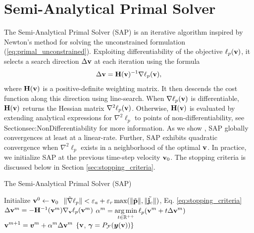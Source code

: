 

\section{Semi-Analytical Primal Solver}
\label{sec:sap_solver}

The Semi-Analytical Primal Solver (SAP) is an iterative algorithm inspired
by Newton's method for solving the unconstrained  formulation (\ref{eq:primal_unconstrained}). Exploiting differentiability of the objective
$\ell_p({\mathbf{v}})$, it selects a search direction $\Delta{\mathbf{v}}$ at each iteration using the
formula
\[
  \Delta{\mathbf{v}} =  {\mathbf{H}}({\mathbf{v}})^{-1} \nabla \ell_p({\mathbf{v}}),
\]
where ${\mathbf{H}}({\mathbf{v}})$ is a positive-definite weighting
matrix. It then descends the cost function along this direction
using line-search.  When $\nabla \ell_p({\mathbf{v}})$ is differentiable,
${\mathbf{H}}({\mathbf{v}})$ returns the Hessian matrix $\nabla^2 \ell_p({\mathbf{v}})$.
Otherwise, ${\mathbf{H}}({\mathbf{v}})$ is evaluated by extending
analytical expressions for $\nabla^2 \ell_p$ to points
of non-differentiability, see Section{sec:NonDifferentiability} for more information.  As we show , SAP 
globally convergences at least at a linear-rate.
Further, SAP exhibits quadratic convergence when
$\nabla^2 \ell_p$ exists in a neighborhood of the
optimal ${\mathbf{v}}$.
In practice, we initialize SAP at the previous time-step velocity ${\mathbf{v}}_0$.
The stopping criteria is discussed below in Section
\ref{sec:stopping_criteria}.

\begin{algorithm}[H]
  \caption{The Semi-Analytical Primal Solver (SAP)}	
	\label{alg:sap}
	\begin{algorithmic}[1]
		\State Initialize ${\mathbf{v}}^0 \gets {\mathbf{v}}_0$
		\RepeatUntil $~\Vert\tilde{\nabla}\ell_p\Vert < \varepsilon_a + \varepsilon_r\max(\Vert\tilde{{\mathbf{p}}}\Vert,\Vert\tilde{{\mathbf{j}}_c}\Vert)$, Eq. \eqref{eq:stopping_criteria}
			\State $\Delta{\mathbf{v}}^{m} = -{\mathbf{H}}^{-1}({\mathbf{v}}^m)\nabla_{\mathbf{v}}\ell_p({\mathbf{v}}^m)$ \label{op:Newton_iteration}
			\State $\displaystyle \alpha^m = \operatorname*{arg\,min}_{t\in\mathbb{R}^{++}} \ell_p({\mathbf{v}}^m + t \Delta{\mathbf{v}}^{m})$
			\State $\displaystyle {\mathbf{v}}^{m+1} = {\bm{v}}^m + \alpha^{m}\Delta{\mathbf{v}}^{m}$
		\EndRepeatUntil
		\State\Return $\{{\mathbf{v}}$, ${\bm\gamma}=P_\mathcal{F}({\bm{y}}({\mathbf{v}}))\}$
	\end{algorithmic}
\end{algorithm}

